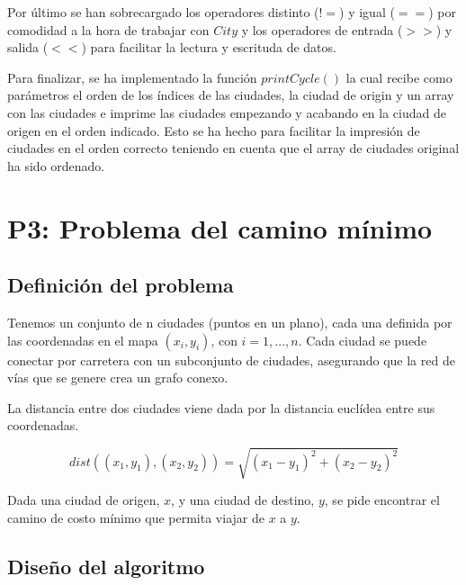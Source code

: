 \documentclass{article}
\begin{document}


Por último se han sobrecargado los operadores distinto ($!=$) y igual ($==$) por comodidad a la hora de trabajar con $City$ y los operadores de entrada ($>>$) y salida ($<<$) para facilitar la lectura y escrituda de datos.



Para finalizar, se ha implementado la función $printCycle()$ la cual recibe como parámetros el orden de los índices de las ciudades, la ciudad de origin y un array con las ciudades e imprime las ciudades empezando y acabando en la ciudad de origen en el orden indicado. Esto se ha hecho para facilitar la impresión de ciudades en el orden correcto teniendo en cuenta que el array de ciudades original ha sido ordenado.


\newpage
\section{P3: Problema del camino mínimo}
\subsection{Definición del problema}
Tenemos un conjunto de n ciudades (puntos en un plano), cada una definida por las coordenadas en el mapa $(x_i, y_i)$, con $i = 1, . . . , n$. Cada ciudad se puede conectar por carretera con
un subconjunto de ciudades, asegurando que la red de vías que se genere crea un grafo conexo.

La distancia entre dos ciudades viene dada por la distancia euclídea entre sus coordenadas.

\[
    dist((x_1,y_1),(x_2,y_2)) = \sqrt{(x_1-y_1)^2+(x_2-y_2)^2}
\]

Dada una ciudad de origen, $x$, y una ciudad de destino, $y$, se pide encontrar el camino de
costo mínimo que permita viajar de $x$ a $y$.
\subsection{Diseño del algoritmo}
\end{document}
